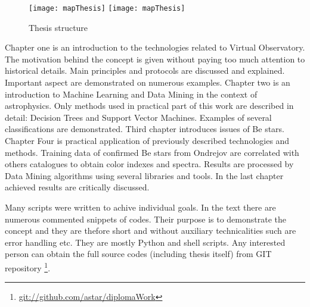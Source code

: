 

\begin{figure}[!htbp]
  \begin{center}
    \leavevmode
    \ifpdf
    \texttt{[image: mapThesis]}
    \else
    \texttt{[image: mapThesis]}
    \fi
    \caption{Thesis structure}
    \label{FigStructure}
  \end{center}
\end{figure}


Chapter one is an introduction to the technologies related to Virtual
Observatory. The motivation behind the concept is given without paying
too much attention to historical details. Main principles and
protocols are discussed and explained. Important aspect are
demonstrated on numerous examples. Chapter two is an introduction to
Machine Learning and Data Mining in the context of astrophysics. Only
methods used in practical part of this work are described in detail:
Decision Trees and Support Vector Machines. Examples of several
classifications are demonstrated. Third chapter introduces issues of
Be stars. Chapter Four is practical application of previously
described technologies and methods. Training data of confirmed Be
stars from Ondrejov are correlated with others catalogues to obtain
color indexes and spectra. Results are processed by Data Mining
algorithms using several libraries and tools. In the last chapter
achieved results are critically discussed.

Many scripts were written to achive individual goals. In the text
there are numerous commented snippets of codes. Their purpose is to
demonstrate the concept and they are thefore short and without
auxiliary technicalities such are error handling etc. They are mostly
Python and shell scripts. Any interested person can obtain the full
source codes (including thesis itself) from GIT repository
\footnote{\url{git://github.com/astar/diplomaWork}}.


